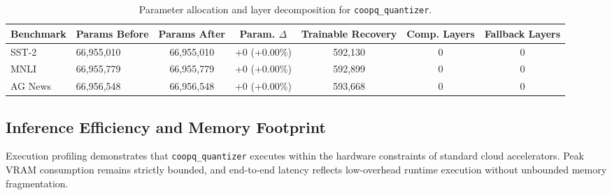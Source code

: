 \begin{table}[t]
\centering
\small
\begin{tabular}{llccccc}
\toprule
\textbf{Benchmark} & \textbf{Params Before} & \textbf{Params After} & \textbf{Param. $\Delta$} & \textbf{Trainable Recovery} & \textbf{Comp. Layers} & \textbf{Fallback Layers} \\
\midrule
SST-2 & 66,955,010 & 66,955,010 & +0 (+0.00\%) & 592,130 & 0 & 0 \\
MNLI & 66,955,779 & 66,955,779 & +0 (+0.00\%) & 592,899 & 0 & 0 \\
AG News & 66,956,548 & 66,956,548 & +0 (+0.00\%) & 593,668 & 0 & 0 \\
\bottomrule
\end{tabular}
\caption{Parameter allocation and layer decomposition for \texttt{coopq\_quantizer}.}
\label{tab:params_coopq_quantizer}
\end{table}

\subsection{Inference Efficiency and Memory Footprint}
Execution profiling demonstrates that \texttt{coopq\_quantizer} executes within the hardware constraints of standard cloud accelerators. Peak VRAM consumption remains strictly bounded, and end-to-end latency reflects low-overhead runtime execution without unbounded memory fragmentation.
